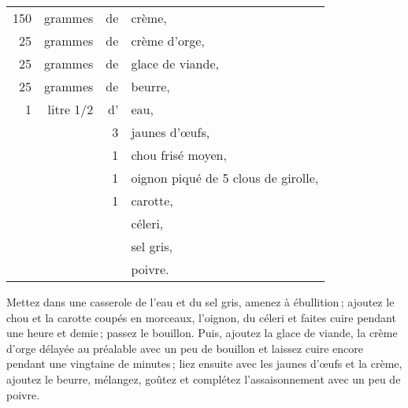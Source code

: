 \footnotesize
\begin{longtable}{rrrp{16em}}                                                    
    150 & grammes     & de & crème,                                                                       \\
     25 & grammes     & de & crème d'orge,                                                                \\
     25 & grammes     & de & glace de viande,                                                             \\
     25 & grammes     & de & beurre,                                                                      \\
      1 & litre 1/2   & d' & eau,                                                                         \\
        &             &  3 & jaunes d'œufs,                                                               \\
        &             &  1 & chou frisé moyen,                                                            \\
        &             &  1 & oignon piqué de 5 clous de girolle,                                          \\
        &             &  1 & carotte,                                                                     \\
        &             &    & céleri,                                                                      \\
        &             &    & sel gris,                                                                    \\
        &             &    & poivre.                                                                      \\
\end{longtable}
\normalsize                            

Mettez dans une casserole de l'eau et du sel gris, amenez à ébullition ;
ajoutez le chou et la carotte coupés en morceaux, l'oignon, du céleri et faites
cuire pendant une heure et demie ; passez le bouillon. Puis, ajoutez la glace
de viande, la crème d'orge délayée au préalable avec un peu de bouillon et
laissez cuire encore pendant une vingtaine de minutes ; liez ensuite avec les
jaunes d'œufs et la crème, ajoutez le beurre, mélangez, goûtez et complétez
l'assaisonnement avec un peu de poivre.

